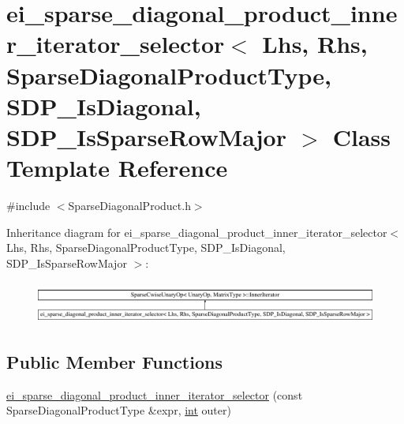 \hypertarget{classei__sparse__diagonal__product__inner__iterator__selector_3_01_lhs_00_01_rhs_00_01_sparse_di47a22a63ac08f0a3077f34df7f660b45}{\section{ei\-\_\-sparse\-\_\-diagonal\-\_\-product\-\_\-inner\-\_\-iterator\-\_\-selector$<$ Lhs, Rhs, Sparse\-Diagonal\-Product\-Type, S\-D\-P\-\_\-\-Is\-Diagonal, S\-D\-P\-\_\-\-Is\-Sparse\-Row\-Major $>$ Class Template Reference}
\label{classei__sparse__diagonal__product__inner__iterator__selector_3_01_lhs_00_01_rhs_00_01_sparse_di47a22a63ac08f0a3077f34df7f660b45}
}


{\ttfamily \#include $<$Sparse\-Diagonal\-Product.\-h$>$}

Inheritance diagram for ei\-\_\-sparse\-\_\-diagonal\-\_\-product\-\_\-inner\-\_\-iterator\-\_\-selector$<$ Lhs, Rhs, Sparse\-Diagonal\-Product\-Type, S\-D\-P\-\_\-\-Is\-Diagonal, S\-D\-P\-\_\-\-Is\-Sparse\-Row\-Major $>$\-:\begin{figure}[H]
\begin{center}
\leavevmode
\includegraphics[height=1.387856cm]{classei__sparse__diagonal__product__inner__iterator__selector_3_01_lhs_00_01_rhs_00_01_sparse_di47a22a63ac08f0a3077f34df7f660b45}
\end{center}
\end{figure}
\subsection*{Public Member Functions}
\begin{DoxyCompactItemize}
\item 
\hyperlink{classei__sparse__diagonal__product__inner__iterator__selector_3_01_lhs_00_01_rhs_00_01_sparse_di47a22a63ac08f0a3077f34df7f660b45_a70bd9357781e634291112463c54548a6}{ei\-\_\-sparse\-\_\-diagonal\-\_\-product\-\_\-inner\-\_\-iterator\-\_\-selector} (const Sparse\-Diagonal\-Product\-Type \&expr, \hyperlink{ioapi_8h_a787fa3cf048117ba7123753c1e74fcd6}{int} outer)
\end{DoxyCompactItemize}
